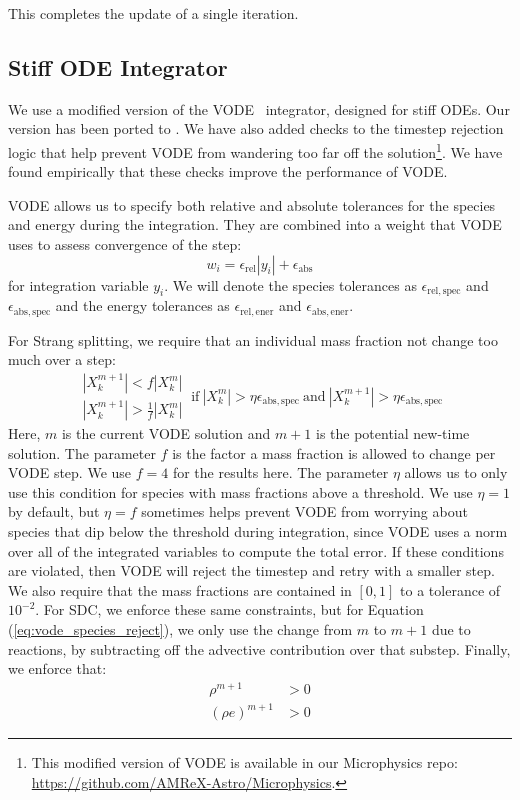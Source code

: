 \documentclass[linenumbers,trackchanges]{aastex631}
\newcommand{\atolspec}{{\epsilon_\mathrm{abs,spec}}}
\newcommand{\rtolspec}{{\epsilon_\mathrm{rel,spec}}}
\newcommand{\atolener}{{\epsilon_\mathrm{abs,ener}}}
\newcommand{\rtolener}{{\epsilon_\mathrm{rel,ener}}}
\begin{document}
This completes the update of a single iteration.

\subsection{Stiff ODE Integrator}\label{sec:VODE}

We use a modified version of the VODE~\citep{vode} integrator,
designed for stiff ODEs.  Our version has been ported to .  We have also added
checks to the timestep rejection logic that help prevent VODE from
wandering too far off the solution\footnote{This modified version of
VODE is available in our Microphysics repo:
\url{https://github.com/AMReX-Astro/Microphysics}.}.  We have found empirically that these checks improve the performance of VODE.

VODE allows us to specify both relative and absolute tolerances
for the species and energy during the integration.  They are combined
into a weight that VODE uses to assess convergence of the step:
\begin{equation}
w_i = \epsilon_\mathrm{rel} |y_i| + \epsilon_\mathrm{abs}
\end{equation}
for integration variable $y_i$.  We will denote the species tolerances
as $\rtolspec$ and $\atolspec$ and the energy tolerances as $\rtolener$ and
$\atolener$.

For Strang splitting, we require that
an individual mass fraction not change too much over a step:
\begin{equation}
\label{eq:vode_species_reject}
\begin{array}{c}|X_k^{m+1}| < f |X_k^m| \\ |X_k^{m+1}| > \frac{1}{f} |X_k^m| \end{array} ~  \mbox{if}~ |X_k^m| > \eta \atolspec ~\mbox{and}~ |X_k^{m+1}| > \eta \atolspec
\end{equation}
Here, $m$ is the current VODE solution and $m+1$ is the potential
new-time solution.  The parameter $f$ is the factor a mass fraction is
allowed to change per VODE step.  We use $f = 4$ for the results here.
The parameter $\eta$ allows us to only use this condition for species
with mass fractions above a threshold.  We use $\eta = 1$ by default,
but $\eta = f$ sometimes helps prevent VODE from worrying about
species that dip below the threshold during integration, since VODE
uses a norm over all of the integrated variables to compute the total
error.  If these conditions are violated, then VODE will reject the
timestep and retry with a smaller step.  We also require that the mass
fractions are contained in $[0, 1]$ to a tolerance of $10^{-2}$.
For SDC, we enforce these same constraints, but for
Equation (\ref{eq:vode_species_reject}), we only use the change from $m$ to $m+1$ due
to reactions, by subtracting off the advective contribution over that substep.
Finally, we enforce that:
\begin{align}
\rho^{m+1} &> 0 \\
(\rho e)^{m+1} &> 0
\end{align}
\end{document}
